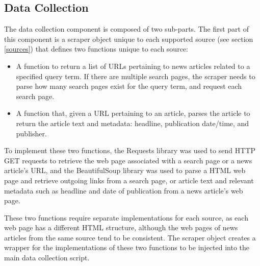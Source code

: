 \documentclass{report}
\begin{document}
\subsection{Data Collection} \label{des-data-collection}

The data collection component is composed of two sub-parts.
The first part of this component is a scraper object unique to each supported source (see section \ref{sources}) that defines two functions unique to each source:
\begin{itemize}
	\item A function to return a list of URLs pertaining to news articles related to a specified query term.
		If there are multiple search pages, the scraper needs to parse how many search pages exist for the query term, and request each search page.
	\item A function that, given a URL pertaining to an article, parses the article to return the article text and metadata: headline, publication date/time, and publisher.
\end{itemize}

To implement these two functions, the Requests library \cite{Requests} was used to send HTTP GET requests to retrieve the web page associated with a search page or a news article's URL, and the BeautifulSoup library \cite{BeautifulSoup} was used to parse a HTML web page and retrieve outgoing links from a search page, or article text and relevant metadata such as headline and date of publication from a news article's web page.

These two functions require separate implementations for each source, as each web page has a different HTML structure, although the web pages of news articles from the same source tend to be consistent.
The scraper object creates a wrapper for the implementations of these two functions to be injected into the main data collection script.
\end{document}
